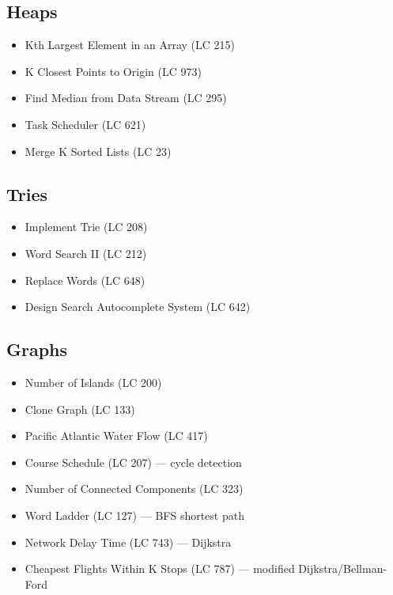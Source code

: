 \documentclass[11pt]{article}
\providecommand{\tightlist}{\setlength{\itemsep}{1pt}\setlength{\parskip}{0pt}}
\begin{document}
\subsection{Heaps}\label{heaps}

\begin{itemize}
\tightlist
\item
  Kth Largest Element in an Array (LC 215)
\item
  K Closest Points to Origin (LC 973)
\item
  Find Median from Data Stream (LC 295)
\item
  Task Scheduler (LC 621)
\item
  Merge K Sorted Lists (LC 23)
\end{itemize}

\subsection{Tries}\label{tries}

\begin{itemize}
\tightlist
\item
  Implement Trie (LC 208)
\item
  Word Search II (LC 212)
\item
  Replace Words (LC 648)
\item
  Design Search Autocomplete System (LC 642)
\end{itemize}

\subsection{Graphs}\label{graphs-1}

\begin{itemize}
\tightlist
\item
  Number of Islands (LC 200)
\item
  Clone Graph (LC 133)
\item
  Pacific Atlantic Water Flow (LC 417)
\item
  Course Schedule (LC 207) --- cycle detection
\item
  Number of Connected Components (LC 323)
\item
  Word Ladder (LC 127) --- BFS shortest path
\item
  Network Delay Time (LC 743) --- Dijkstra
\item
  Cheapest Flights Within K Stops (LC 787) --- modified Dijkstra/Bellman-Ford
\end{itemize}
\end{document}
